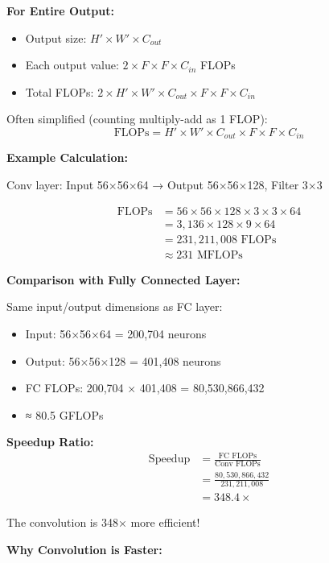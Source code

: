 \documentclass[12pt]{article}
\newcommand{\explanation}[1]{{\color{explanationcolor}#1}}
\begin{document}
\begin{enumerate}[(a)]
{{    \textbf{For Entire Output:}
    \begin{itemize}
        \item Output size: $H' \times W' \times C_{out}$
        \item Each output value: $2 \times F \times F \times C_{in}$ FLOPs
        \item Total FLOPs: $2 \times H' \times W' \times C_{out} \times F \times F \times C_{in}$
    \end{itemize}
    
    Often simplified (counting multiply-add as 1 FLOP):
    \[\boxed{\text{FLOPs} = H' \times W' \times C_{out} \times F \times F \times C_{in}}\]
    }
    
    \textbf{Example Calculation:}
    
    \explanation{
    Conv layer: Input 56×56×64 → Output 56×56×128, Filter 3×3
    
    \begin{align}
    \text{FLOPs} &= 56 \times 56 \times 128 \times 3 \times 3 \times 64\\
    &= 3,136 \times 128 \times 9 \times 64\\
    &= 231,211,008 \text{ FLOPs}\\
    &\approx 231 \text{ MFLOPs}
    \end{align}
    }
    
    \textbf{Comparison with Fully Connected Layer:}
    
    \explanation{
    Same input/output dimensions as FC layer:
    \begin{itemize}
        \item Input: 56×56×64 = 200,704 neurons
        \item Output: 56×56×128 = 401,408 neurons
        \item FC FLOPs: 200,704 × 401,408 = 80,530,866,432
        \item ≈ 80.5 GFLOPs
    \end{itemize}
    
    \textbf{Speedup Ratio:}
    \begin{align}
    \text{Speedup} &= \frac{\text{FC FLOPs}}{\text{Conv FLOPs}}\\
    &= \frac{80,530,866,432}{231,211,008}\\
    &= 348.4\times
    \end{align}
    
    The convolution is 348× more efficient!
    }
    
    \textbf{Why Convolution is Faster:}
    
}
\end{enumerate}
\end{document}
